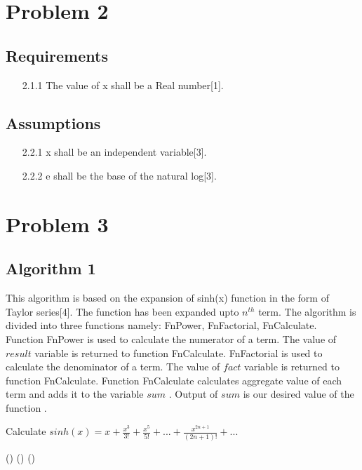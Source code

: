 \documentclass{article}
\begin{document}
\section{Problem 2}
\subsection{Requirements}
\begin{itemize}
\item [2.1.1]The value of x shall be a Real number[1].
\end{itemize}


\subsection{Assumptions}
\begin{itemize}
\item [2.2.1]x shall be an independent variable[3].
\item [2.2.2]e shall be the base of the natural log[3].
\end{itemize}
\pagebreak
\section{Problem 3}
\subsection{Algorithm 1}
This algorithm is based on the expansion of sinh(x) function in the form of Taylor series[4]. The function has been expanded upto $n^{th}$ term. The algorithm is divided into three functions namely: FnPower, FnFactorial, FnCalculate. \\Function FnPower is used to calculate the numerator of a term. The value of $result$ variable is returned to function FnCalculate. FnFactorial is used to calculate the denominator of a term. The value of $fact$ variable is returned to function FnCalculate. Function FnCalculate calculates aggregate value of each term and adds it to the variable $sum$ . Output of $sum$ is our desired value of the function .
\begin{algorithm}
\caption{ Calculate $sinh(x)= x+ \frac {x^3}{3!}+ \frac {x^5}{5!} + ... + \frac {x^{2n+1}}{(2n+1)!} + ...$ }
\SetAlgoLined

\Fn(){}{
}
\Fn(){}{
}
\Fn(){}{
}
\end{algorithm}
\end{document}
